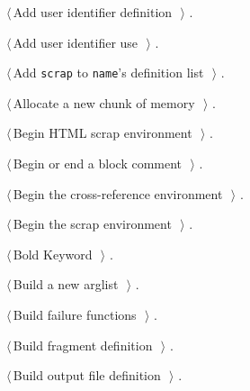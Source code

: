 \documentclass[a4paper]{report}
\begin{document}
{\begin{list}{}{\setlength{\itemsep}{-\parsep}\setlength{\itemindent}{-\leftmargin}}
\item $\langle\,$Add user identifier definition\nobreak\ {\footnotesize {}}$\,\rangle$ {\footnotesize {\NWtxtRefIn} .}
\item $\langle\,$Add user identifier use\nobreak\ {\footnotesize {}}$\,\rangle$ {\footnotesize {\NWtxtRefIn} .}
\item $\langle\,$Add \verb|scrap| to \verb|name|'s definition list\nobreak\ {\footnotesize {}}$\,\rangle$ {\footnotesize {\NWtxtRefIn} .
}
\item $\langle\,$Allocate a new chunk of memory\nobreak\ {\footnotesize {}}$\,\rangle$ {\footnotesize {\NWtxtRefIn} .}
\item $\langle\,$Begin HTML scrap environment\nobreak\ {\footnotesize {}}$\,\rangle$ {\footnotesize {\NWtxtRefIn} .
}
\item $\langle\,$Begin or end a block comment\nobreak\ {\footnotesize {}}$\,\rangle$ {\footnotesize {\NWtxtRefIn} .}
\item $\langle\,$Begin the cross-reference environment\nobreak\ {\footnotesize {}}$\,\rangle$ {\footnotesize {\NWtxtRefIn} .
}
\item $\langle\,$Begin the scrap environment\nobreak\ {\footnotesize {}}$\,\rangle$ {\footnotesize {\NWtxtRefIn} .
}
\item $\langle\,$Bold Keyword\nobreak\ {\footnotesize {}}$\,\rangle$ {\footnotesize {\NWtxtRefIn} .}
\item $\langle\,$Build a new arglist\nobreak\ {\footnotesize {}}$\,\rangle$ {\footnotesize {\NWtxtRefIn} .}
\item $\langle\,$Build failure functions\nobreak\ {\footnotesize {}}$\,\rangle$ {\footnotesize {\NWtxtRefIn} .}
\item $\langle\,$Build fragment definition\nobreak\ {\footnotesize {}}$\,\rangle$ {\footnotesize {\NWtxtRefIn} .}
\item $\langle\,$Build output file definition\nobreak\ {\footnotesize {}}$\,\rangle$ {\footnotesize {\NWtxtRefIn} .}

\end{list}}
\end{document}
